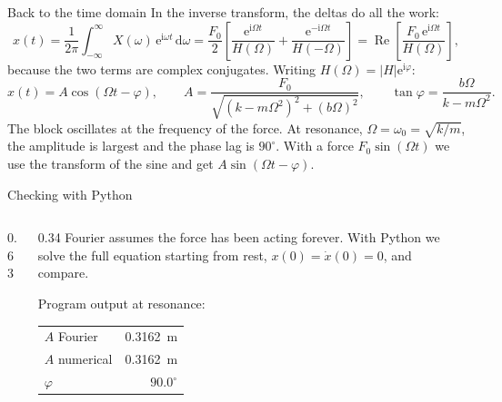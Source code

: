 \documentclass[11pt,aspectratio=169]{beamer}
\newcommand{\dd}{\,\mathrm{d}}
\newcommand{\ii}{\mathrm{i}}
\newcommand{\e}{\mathrm{e}}
\begin{document}
\begin{frame}{Back to the time domain}
  In the inverse transform, the deltas do all the work:
  \[
    x(t)=\frac{1}{2\pi}\int_{-\infty}^{\infty}X(\omega)\,\e^{\ii\omega t}\dd\omega
    =\frac{F_0}{2}\left[\frac{\e^{\ii\Omega t}}{H(\Omega)}+\frac{\e^{-\ii\Omega t}}{H(-\Omega)}\right]
    =\operatorname{Re}\!\left[\frac{F_0\,\e^{\ii\Omega t}}{H(\Omega)}\right],
  \]
  because the two terms are complex conjugates. Writing $H(\Omega)=|H|\e^{\ii\varphi}$:
  \[
    \boxed{x(t)=A\cos(\Omega t-\varphi)},\qquad
    A=\frac{F_0}{\sqrt{(k-m\Omega^2)^2+(b\Omega)^2}},\qquad
    \tan\varphi=\frac{b\Omega}{k-m\Omega^2}.
  \]
  \vspace{1mm}
  The block oscillates at the frequency of the force. At resonance, $\Omega=\omega_0=\sqrt{k/m}$,
  the amplitude is largest and the phase lag is $90^\circ$. With a force $F_0\sin(\Omega t)$ we
  use the transform of the sine and get $A\sin(\Omega t-\varphi)$.
\end{frame}

\begin{frame}[fragile]{Checking with Python}
  \begin{columns}[T]
    \begin{column}{0.63\textwidth}
      \vspace*{-4mm}
      
    \end{column}
    \begin{column}{0.34\textwidth}
      \small
      Fourier assumes the force has been acting forever. With Python we solve the full
      equation starting from rest, $x(0)=\dot x(0)=0$, and compare.

      \vspace{3mm}
      Program output at resonance:
      \begin{center}
        \begin{tabular}{lr}
          \toprule
          $A$ Fourier & \SI{0.3162}{m}\\
          $A$ numerical & \SI{0.3162}{m}\\
          $\varphi$ & $90.0^\circ$\\
          \bottomrule
        \end{tabular}
      \end{center}
    \end{column}
  \end{columns}
\end{frame}
\end{document}

